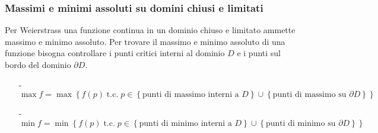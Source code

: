 \documentclass[a4paper]{article}
\newcommand\tc{\text{t.c.}}   %
\begin{document}
\subsubsection*{Massimi e minimi assoluti su domini chiusi e limitati}
Per Weierstrass una funzione continua in un dominio chiuso e limitato ammette massimo e minimo assoluto. Per trovare il massimo e minimo
assoluto di una funzione bisogna controllare i punti critici interni al dominio \(D\) e i punti sul bordo del dominio \(\partial D\).

\begin{itemize}[topsep=3pt, itemsep=0pt]
	\item[-] \(\max f = \max \left\{ f(p) \; \tc \; p \in \left\{\text{punti di massimo interni a } D\right\} \cup \left\{\text{punti di massimo su } \partial D \right\} \right\}\)
	\item[-] \(\min f = \min \left\{ f(p) \; \tc \; p \in \left\{\text{punti di minimo interni a } D\right\} \cup \left\{\text{punti di minimo su } \partial D \right\} \right\}\)
\end{itemize}
\end{document}
